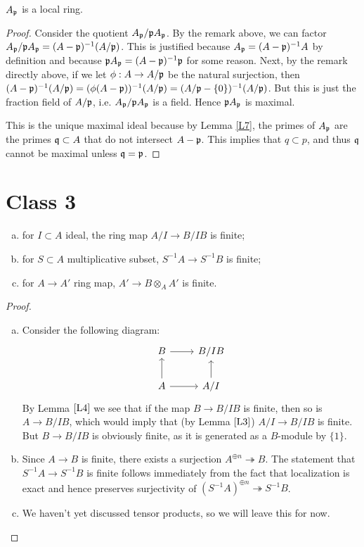 \documentclass{../mathnotes}
\begin{document}
\begin{lem}
\label{L9}
$A_{\mathfrak{p}}$ is a local ring.
\end{lem}
\begin{proof}
Consider the quotient $A_\mathfrak p/\mathfrak pA_\mathfrak p$.  By the remark above, we 
can factor $A_{\mathfrak{p}} / \mathfrak{p}A_{\mathfrak{p}} = (A - \mathfrak{p})^{-1} (A/\mathfrak{p})$. This is justified because $A_\mathfrak p=(A-\mathfrak p)^{-1}A$ by definition and because $\mathfrak pA_\mathfrak p=(A-\mathfrak p)^{-1}\mathfrak p$ for some reason. Next, by the remark directly above, if we let $\phi:A\to A/\mathfrak p$ be the natural surjection, then $(A-\mathfrak p)^{-1}(A/\mathfrak p)=(\phi(A-\mathfrak p))^{-1}(A/\mathfrak p)=(A/\mathfrak p-\{0\})^{-1}(A/\mathfrak p)$. But this is just the fraction field of $A/\mathfrak p$, i.e. $A_\mathfrak p/\mathfrak pA_\mathfrak p$ is a field. Hence $\mathfrak pA_\mathfrak p$ is maximal.

This is the unique maximal ideal because by Lemma \ref{L7}, the primes of $A_{\mathfrak p}$ are the primes $\mathfrak{q}\subset A$ that do not intersect $A-\mathfrak{p}$. This implies that $q\subset p$, and thus $\mathfrak q$ cannot be maximal unless $\mathfrak q = \mathfrak p$.
\end{proof}




\section*{Class 3}

\begin{lem}
\label{L10}
\begin{enumerate}[(a)]
Let $A \overset{\phi}{\to} B$ be a finite ring map. Then
\item for $I \subset A$ ideal, the ring map $A/I \to B/IB$ is finite;
\item for $S\subset A$ multiplicative subset, $S^{-1}A \to S^{-1}B$ is finite;
\item for $A\to A'$ ring map, $A' \to B \otimes_A A'$ is finite.
\end{enumerate}
\end{lem}
\begin{proof}
\begin{enumerate}[(a)]
\item Consider the following diagram:
\[
\begin{tikzcd}
B\arrow{r} & B/IB\\
A\arrow{u}\arrow{r} & A/I\arrow{u}
\end{tikzcd}
\]
By Lemma $\ref{L4}$ we see that if the map $B\to B/IB$ is finite, then so is $A\to B/IB$, which would imply that (by Lemma $\ref{L3}$) $A/I\to B/IB$ is finite. But $B\to B/IB$ is obviously finite, as it is generated as a $B$-module by $\{1\}$.
\item Since $A\to B$ is finite, there exists a surjection $A^{\oplus n}\twoheadrightarrow B$. The statement that $S^{-1}A\to S^{-1}B$ is finite follows immediately from the fact that localization is exact and hence preserves surjectivity of $(S^{-1}A)^{\oplus n}\twoheadrightarrow S^{-1}B$.
\item We haven't yet discussed tensor products, so we will leave this for now.
\end{enumerate}
\end{proof}
\end{document}
